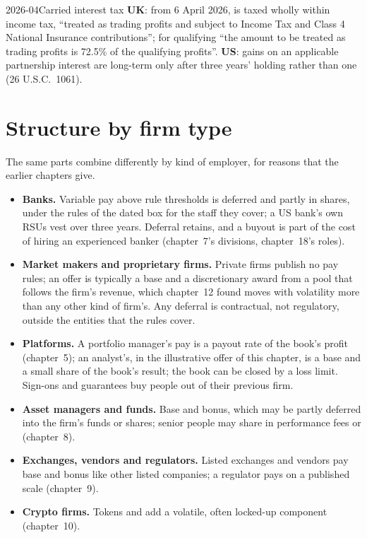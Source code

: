 \begin{dated}{2026-04}{Carried interest tax}\label{dat:in:how-pay-works:carry}
\textbf{UK}: from 6 April 2026,  is taxed wholly within income tax, ``treated as trading profits and
subject to Income Tax and Class 4 National Insurance contributions''; for qualifying  ``the amount to be
treated as trading profits is 72.5\% of the qualifying profits''. \textbf{US}: gains on an applicable partnership
interest are long-term only after three years' holding rather than one (26 U.S.C.\ 1061).
\end{dated}

\section{Structure by firm type}

The same parts combine differently by kind of employer, for reasons that the earlier chapters give.
\begin{itemize}
\item \textbf{Banks.} Variable pay above rule thresholds is deferred and partly in shares, under the rules of the dated
box for the staff they cover; a US bank's own RSUs vest over three years. Deferral retains, and a buyout is
part of the cost of hiring an experienced banker (chapter~7's divisions, chapter~18's roles).
\item \textbf{Market makers and proprietary firms.} Private firms publish no pay rules; an offer is typically a base
and a discretionary award from a pool that follows the firm's revenue, which chapter~12 found moves with volatility more than
any other kind of firm's. Any deferral is contractual, not regulatory, outside the entities that the rules cover.
\item \textbf{Platforms.} A portfolio manager's pay is a payout rate of the book's profit (chapter~5); an analyst's, in
the illustrative offer of this chapter, is a base and a small share of the book's result; the book can be closed by a
loss limit. Sign-ons and guarantees buy people out of their previous firm.
\item \textbf{Asset managers and funds.} Base and bonus, which may be partly deferred into the firm's funds or shares;
senior people may share in performance fees or  (chapter~8).
\item \textbf{Exchanges, vendors and regulators.} Listed exchanges and vendors pay base and bonus like other listed
companies; a regulator pays on a published scale (chapter~9).
\item \textbf{Crypto firms.} Tokens and  add a volatile, often locked-up component (chapter~10).
\end{itemize}

